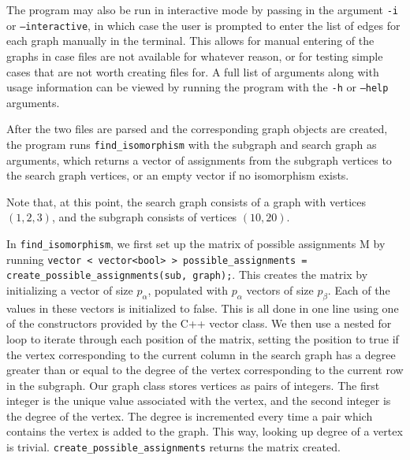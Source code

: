 \documentclass{article}
\begin{document}
  The program may also be run in interactive mode by passing in the argument \texttt{-i} or \texttt{--interactive}, in which case the user is prompted to enter the list of edges for each graph manually in the terminal. This allows for manual entering of the graphs in case files are not available for whatever reason, or for testing simple cases that are not worth creating files for. A full list of arguments along with usage information can be viewed by running the program with the \texttt{-h} or \texttt{--help} arguments. 

  After the two files are parsed and the corresponding graph objects are created, the program runs \texttt{find\_isomorphism} with the subgraph and search graph as arguments, which returns a vector of assignments from the subgraph vertices to the search graph vertices, or an empty vector if no isomorphism exists.

  Note that, at this point, the search graph consists of a graph with vertices $(1, 2, 3)$, and the subgraph consists of vertices $(10, 20)$.

  In \texttt{find\_isomorphism}, we first set up the matrix of possible assignments M by running \texttt{vector < vector<bool> > possible\_assignments = create\_possible\_assignments(sub, graph);}. This creates the matrix by initializing a vector of size $p_{\alpha}$, populated with $p_{\alpha}$ vectors of size $p_{\beta}$. Each of the values in these vectors is initialized to false. This is all done in one line using one of the constructors provided by the C++ vector class. We then use a nested for loop to iterate through each position of the matrix, setting the position to true if the vertex corresponding to the current column in the search graph has a degree greater than or equal to the degree of the vertex corresponding to the current row in the subgraph. Our graph class stores vertices as pairs of integers. The first integer is the unique value associated with the vertex, and the second integer is the degree of the vertex. The degree is incremented every time a pair which contains the vertex is added to the graph. This way, looking up degree of a vertex is trivial. \texttt{create\_possible\_assignments} returns the matrix created.
\end{document}
